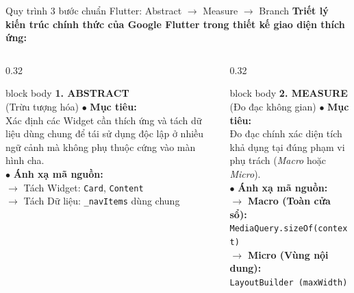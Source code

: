 \documentclass[aspectratio=169, 10pt]{beamer}
\begin{document}
\begin{frame}{Quy trình 3 bước chuẩn Flutter: Abstract $\rightarrow$ Measure $\rightarrow$ Branch}
  \vspace{-0.12cm}
  \textbf{Triết lý kiến trúc chính thức của Google Flutter trong thiết kế giao diện thích ứng:}
  \vspace{0.18cm}

  \begin{columns}[T]
    \begin{column}{0.32\textwidth}
      \begin{beamercolorbox}[rounded=true, shadow=false, wd=\textwidth, sep=5pt]{block body}
        \textbf{\footnotesize\color{blue!80!black}1. ABSTRACT}\\[1.5pt]
        {\scriptsize\color{blue!80!black}(Trừu tượng hóa)}
        \vskip 0.08cm
        \footnotesize
        $\bullet$ \textbf{Mục tiêu:}\\
        Xác định các Widget cần thích ứng và tách dữ liệu dùng chung để tái sử dụng độc lập ở nhiều ngữ cảnh mà không phụ thuộc cứng vào màn hình cha.\\[0.12cm]
        $\bullet$ \textbf{Ánh xạ mã nguồn:}\\
        $\rightarrow$ Tách Widget: \texttt{Card}, \texttt{Content}\\
        $\rightarrow$ Tách Dữ liệu: \texttt{\_navItems} dùng chung
      \end{beamercolorbox}
    \end{column}

    \begin{column}{0.32\textwidth}
      \begin{beamercolorbox}[rounded=true, shadow=false, wd=\textwidth, sep=5pt]{block body}
        \textbf{\footnotesize\color{blue!80!black}2. MEASURE}\\[1.5pt]
        {\scriptsize\color{blue!80!black}(Đo đạc không gian)}
        \vskip 0.08cm
        \footnotesize
        $\bullet$ \textbf{Mục tiêu:}\\
        Đo đạc chính xác diện tích khả dụng tại đúng phạm vi phụ trách (\textit{Macro} hoặc \textit{Micro}).\\[0.12cm]
        $\bullet$ \textbf{Ánh xạ mã nguồn:}\\
        $\rightarrow$ \textbf{Macro (Toàn cửa sổ):}\\
        \texttt{MediaQuery.sizeOf(context)}\\
        $\rightarrow$ \textbf{Micro (Vùng nội dung):}\\
        \texttt{LayoutBuilder (maxWidth)}
      \end{beamercolorbox}
    \end{column}


\end{columns}
\end{frame}
\end{document}
